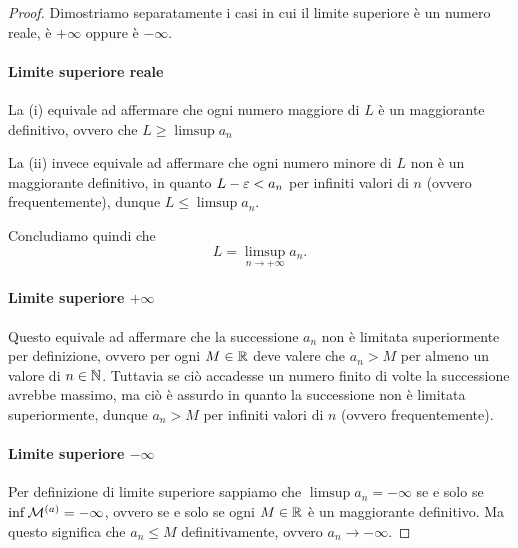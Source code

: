 \begin{proof} 
    Dimostriamo separatamente i casi in cui il limite superiore è un numero reale, è $+\infty$ oppure è $-\infty$.
    
    \paragraph{Limite superiore reale}
    La (i) equivale ad affermare che ogni numero maggiore di $L$ è un maggiorante definitivo, ovvero che $L \geq \limsup a_n$

    La (ii) invece equivale ad affermare che ogni numero minore di $L$ non è un maggiorante definitivo, in quanto $L - \varepsilon < a_n$ per infiniti valori di $n$ (ovvero frequentemente), dunque $L \leq \limsup a_n$.

    Concludiamo quindi che \[
        L = \limsup_{n \to +\infty} a_n. 
    \]

    \paragraph{Limite superiore $+\infty$} Questo equivale ad affermare che la successione $a_n$ non è limitata superiormente per definizione, ovvero per ogni $M \in \mathbb{R}$ deve valere che $a_n > M$ per almeno un valore di $n \in \mathbb{N}$. Tuttavia se ciò accadesse un numero finito di volte la successione avrebbe massimo, ma ciò è assurdo in quanto la successione non è limitata superiormente, dunque $a_n > M$ per infiniti valori di $n$ (ovvero frequentemente).

    \paragraph{Limite superiore $-\infty$}
    Per definizione di limite superiore sappiamo che $\limsup a_n = -\infty$ se e solo se  $\inf \mathcal{M}^{(a)} = -\infty$, ovvero se e solo se ogni $M \in \mathbb{R}$ è un maggiorante definitivo. Ma questo significa che $a_n \leq M$ definitivamente, ovvero $a_n \to -\infty$.
\end{proof}

